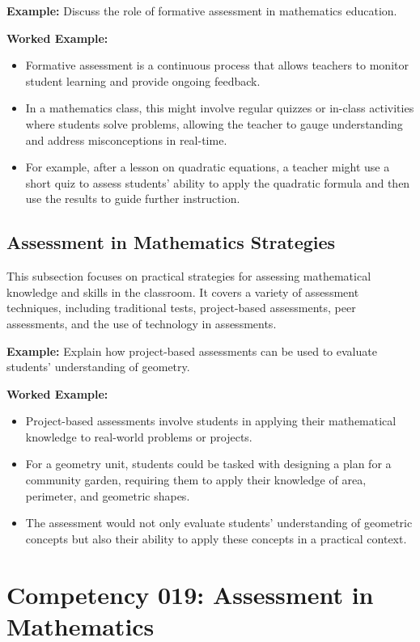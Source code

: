 \documentclass{book}
\begin{document}
\textbf{Example:} Discuss the role of formative assessment in mathematics education.


\textbf{Worked Example:}
\begin{itemize}
        \item Formative assessment is a continuous process that allows teachers to monitor student learning and provide ongoing feedback.
        \item In a mathematics class, this might involve regular quizzes or in-class activities where students solve problems, allowing the teacher to gauge understanding and address misconceptions in real-time.
        \item For example, after a lesson on quadratic equations, a teacher might use a short quiz to assess students' ability to apply the quadratic formula and then use the results to guide further instruction.
\end{itemize}


\subsection{Assessment in Mathematics Strategies}
This subsection focuses on practical strategies for assessing mathematical knowledge and skills in the classroom. It covers a variety of assessment techniques, including traditional tests, project-based assessments, peer assessments, and the use of technology in assessments.


\textbf{Example:} Explain how project-based assessments can be used to evaluate students' understanding of geometry.


\textbf{Worked Example:}
\begin{itemize}
        \item Project-based assessments involve students in applying their mathematical knowledge to real-world problems or projects.
        \item For a geometry unit, students could be tasked with designing a plan for a community garden, requiring them to apply their knowledge of area, perimeter, and geometric shapes.
        \item The assessment would not only evaluate students' understanding of geometric concepts but also their ability to apply these concepts in a practical context.
\end{itemize}

\section{Competency 019: Assessment in Mathematics}
\end{document}
